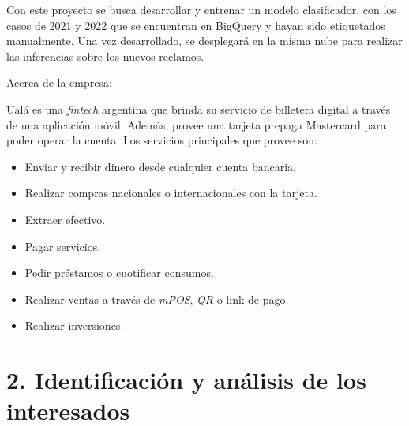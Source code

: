 \documentclass[
11pt, %
]{charter}
\begin{document}

Con este proyecto se busca desarrollar y entrenar un modelo clasificador, con los casos de 2021 y 2022 que se encuentran en BigQuery y hayan sido etiquetados manualmente. Una vez desarrollado, se desplegará en la misma nube para realizar las inferencias sobre los nuevos reclamos.

Acerca de la empresa:

Ualá es una \textit{fintech} argentina que brinda su servicio de billetera digital a través de una aplicación móvil. Además, provee una tarjeta prepaga Mastercard para poder operar la cuenta. Los servicios principales que provee son:
\begin{itemize}
	\item Enviar y recibir dinero desde cualquier cuenta bancaria.
	\item Realizar compras nacionales o internacionales con la tarjeta.
	\item Extraer efectivo.
	\item Pagar servicios.
	\item Pedir préstamos o cuotificar consumos.
	\item Realizar ventas a través de \textit{mPOS}, \textit{QR} o link de pago.
	\item Realizar inversiones.
\end{itemize}




\section{2. Identificación y análisis de los interesados}
\label{sec:interesados}
\end{document}
